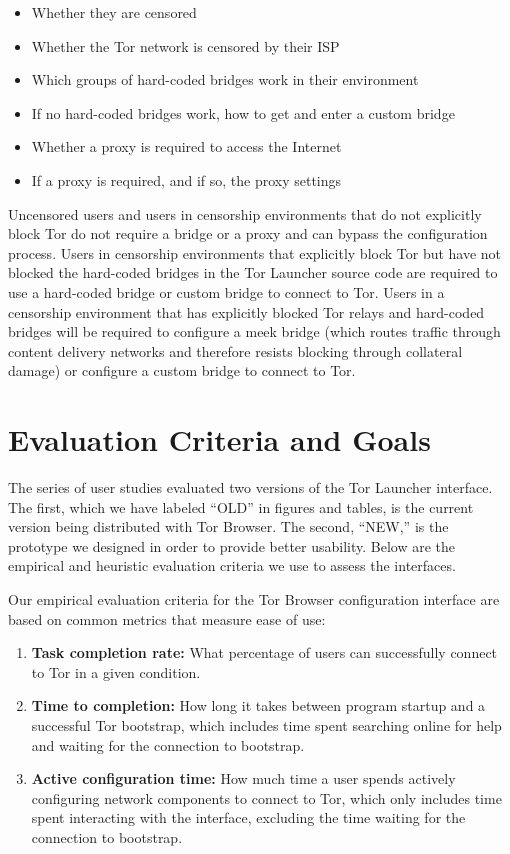 \documentclass[USenglish,oneside,twocolumn]{article}
\begin{document}
\begin{itemize}
	\item{Whether they are censored} 
	\item{Whether the Tor network is censored by their ISP}
	\item{Which groups of hard-coded bridges work in their environment} 
	\item{If no hard-coded bridges work, how to get and enter a custom bridge} 
	\item{Whether a proxy is required to access the Internet}
	\item{If a proxy is required, and if so, the proxy settings}
\end{itemize}

Uncensored users and users in censorship environments that do not explicitly 
block Tor do not require a bridge or a proxy and can bypass the configuration process.
Users in censorship environments that explicitly block Tor but have not blocked the 
hard-coded bridges in the Tor Launcher source code are required to use a 
hard-coded bridge or custom bridge to connect to Tor. Users in a censorship environment that has explicitly 
blocked Tor relays and hard-coded bridges will be required to configure a meek bridge (which 
routes traffic through content delivery networks and therefore resists blocking through collateral damage) or 
configure a custom bridge to connect to Tor.


\section{Evaluation Criteria and Goals}
\label{sec:goals}
The series of user studies evaluated two versions of the Tor Launcher interface.
The first, which we have labeled ``OLD'' in figures and tables,
is the current version being distributed with Tor Browser.
The second, ``NEW,'' is the prototype we designed
in order to provide better usability. Below are the empirical and 
heuristic evaluation criteria we use to assess the interfaces. 

Our empirical evaluation criteria for the Tor Browser configuration
interface are based on common metrics that measure ease of use: \\

\begin{enumerate}
    \item {\bfseries Task completion rate:} What percentage of users can successfully connect to Tor in a given condition.
    \item {\bfseries  Time to completion:} How long it takes between program startup and a successful Tor bootstrap, which includes time spent searching online for help and waiting for the connection to bootstrap.
    \item {\bfseries Active configuration time:} How much time a user spends actively configuring network components to connect to Tor, which only includes time spent interacting with the interface, excluding the time waiting for the connection to bootstrap.
\end{enumerate}
\end{document}
